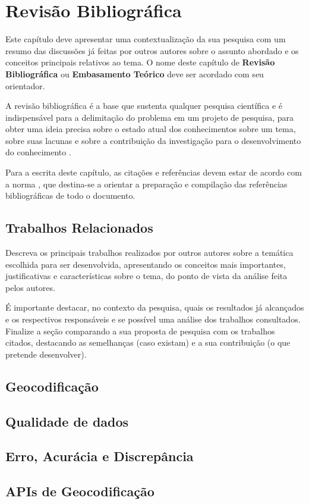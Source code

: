 \chapter{Revisão Bibliográfica} \label{RevisaoBibliografica}

Este capítulo deve apresentar uma contextualização da sua pesquisa com um resumo das discussões já feitas por outros autores sobre o assunto abordado e os conceitos principais relativos ao tema. O nome deste capítulo  de \textbf{Revisão Bibliográfica} ou \textbf{Embasamento Teórico} deve ser acordado com seu orientador.

A revisão bibliográfica é a base que sustenta qualquer pesquisa científica e  é indispensável para a delimitação do problema em um projeto de pesquisa,  para obter uma ideia precisa sobre o estado atual dos conhecimentos sobre um tema, sobre suas lacunas e sobre a contribuição da investigação para o desenvolvimento do conhecimento \cite{marconi2003}. 

Para a escrita deste capítulo, as citações e referências devem estar de acordo com a norma \cite{NBR6023:2002}, que destina-se a orientar a preparação e compilação das  referências bibliográficas de todo o documento.

\section{Trabalhos Relacionados}

Descreva os principais trabalhos realizados por outros autores sobre a temática escolhida para ser desenvolvida, apresentando os conceitos mais importantes, justificativas e características sobre o tema, do ponto de vista da análise feita pelos autores. 

É importante destacar, no contexto da pesquisa, quais os resultados já alcançados e os respectivos responsáveis e se possível uma análise  dos trabalhos consultados. Finalize a seção comparando a sua proposta de pesquisa com os trabalhos citados, destacando as semelhanças (caso existam) e a sua contribuição (o que pretende desenvolver).


\section{Geocodificação}

\section{Qualidade de dados}

\section{Erro, Acurácia e Discrepância}

\section{APIs de Geocodificação}



